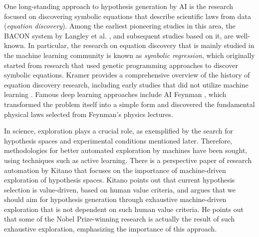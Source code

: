 One long-standing approach to hypothesis generation by AI is the research focused on discovering symbolic equations that describe scientific laws from data (\textit{equation discovery}). Among the earliest pioneering studies in this area, the BACON system by Langley et al. \cite{langley1987scientific}, and subsequent studies based on it, are well-known. In particular, the research on equation discovery that is mainly studied in the machine learning community is known as \textit{symbolic regression}, which originally started from research that used genetic programming approaches to discover symbolic equations.
 Kramer provides a comprehensive overview of the history of equation discovery research, including early studies that did not utilize machine learning \cite{kramer2023automated}. Famous deep learning approaches include AI Feynman \cite{udrescu2020ai,udrescu2020ai2}, which transformed the problem itself into a simple form and discovered the fundamental physical laws selected from Feynman's physics lectures.

In science, exploration plays a crucial role, as exemplified by the search for hypothesis spaces and experimental conditions mentioned later. Therefore, methodologies for better automated exploration by machines have been sought, using techniques such as active learning. There is a perspective paper of research automation by Kitano \cite{kitano2021nobel} that focuses on the importance of machine-driven exploration of hypothesis spaces. Kitano points out that current hypothesis selection is value-driven, based on human value criteria, and argues that we should aim for hypothesis generation through exhaustive machine-driven exploration that is not dependent on such human value criteria. He points out that some of the Nobel Prize-winning research is actually the result of such exhaustive exploration, emphasizing the importance of this approach.

